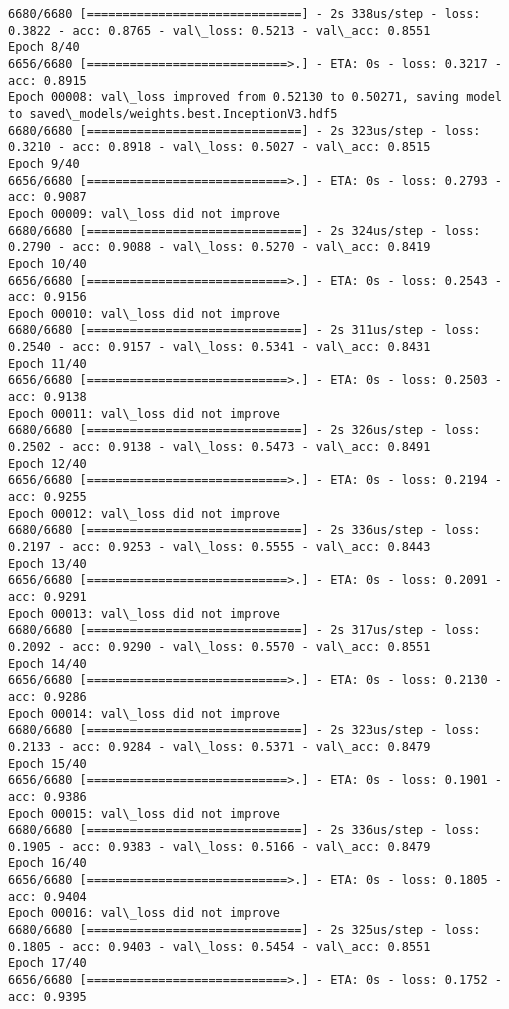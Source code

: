\documentclass[11pt]{article}
\begin{document}
\begin{Verbatim}[commandchars=\\\{\}]
6680/6680 [==============================] - 2s 338us/step - loss: 0.3822 - acc: 0.8765 - val\_loss: 0.5213 - val\_acc: 0.8551
Epoch 8/40
6656/6680 [============================>.] - ETA: 0s - loss: 0.3217 - acc: 0.8915
Epoch 00008: val\_loss improved from 0.52130 to 0.50271, saving model to saved\_models/weights.best.InceptionV3.hdf5
6680/6680 [==============================] - 2s 323us/step - loss: 0.3210 - acc: 0.8918 - val\_loss: 0.5027 - val\_acc: 0.8515
Epoch 9/40
6656/6680 [============================>.] - ETA: 0s - loss: 0.2793 - acc: 0.9087
Epoch 00009: val\_loss did not improve
6680/6680 [==============================] - 2s 324us/step - loss: 0.2790 - acc: 0.9088 - val\_loss: 0.5270 - val\_acc: 0.8419
Epoch 10/40
6656/6680 [============================>.] - ETA: 0s - loss: 0.2543 - acc: 0.9156
Epoch 00010: val\_loss did not improve
6680/6680 [==============================] - 2s 311us/step - loss: 0.2540 - acc: 0.9157 - val\_loss: 0.5341 - val\_acc: 0.8431
Epoch 11/40
6656/6680 [============================>.] - ETA: 0s - loss: 0.2503 - acc: 0.9138
Epoch 00011: val\_loss did not improve
6680/6680 [==============================] - 2s 326us/step - loss: 0.2502 - acc: 0.9138 - val\_loss: 0.5473 - val\_acc: 0.8491
Epoch 12/40
6656/6680 [============================>.] - ETA: 0s - loss: 0.2194 - acc: 0.9255
Epoch 00012: val\_loss did not improve
6680/6680 [==============================] - 2s 336us/step - loss: 0.2197 - acc: 0.9253 - val\_loss: 0.5555 - val\_acc: 0.8443
Epoch 13/40
6656/6680 [============================>.] - ETA: 0s - loss: 0.2091 - acc: 0.9291
Epoch 00013: val\_loss did not improve
6680/6680 [==============================] - 2s 317us/step - loss: 0.2092 - acc: 0.9290 - val\_loss: 0.5570 - val\_acc: 0.8551
Epoch 14/40
6656/6680 [============================>.] - ETA: 0s - loss: 0.2130 - acc: 0.9286
Epoch 00014: val\_loss did not improve
6680/6680 [==============================] - 2s 323us/step - loss: 0.2133 - acc: 0.9284 - val\_loss: 0.5371 - val\_acc: 0.8479
Epoch 15/40
6656/6680 [============================>.] - ETA: 0s - loss: 0.1901 - acc: 0.9386
Epoch 00015: val\_loss did not improve
6680/6680 [==============================] - 2s 336us/step - loss: 0.1905 - acc: 0.9383 - val\_loss: 0.5166 - val\_acc: 0.8479
Epoch 16/40
6656/6680 [============================>.] - ETA: 0s - loss: 0.1805 - acc: 0.9404
Epoch 00016: val\_loss did not improve
6680/6680 [==============================] - 2s 325us/step - loss: 0.1805 - acc: 0.9403 - val\_loss: 0.5454 - val\_acc: 0.8551
Epoch 17/40
6656/6680 [============================>.] - ETA: 0s - loss: 0.1752 - acc: 0.9395

\end{Verbatim}
\end{document}
